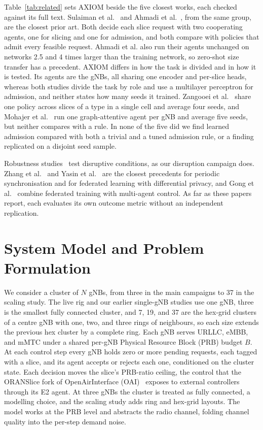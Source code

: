\documentclass[pdflatex,sn-basic,Numbered]{sn-jnl}
\begin{document}
Table~\ref{tab:related} sets AXIOM beside the five closest works, each checked against its full text. Sulaiman et al.~\cite{sulaiman2023coordinated} and Ahmadi et al.~\cite{ahmadi2024generalizable}, from the same group, are the closest prior art. Both decide each slice request with two cooperating agents, one for slicing and one for admission, and both compare with policies that admit every feasible request. Ahmadi et al. also run their agents unchanged on networks 2.5 and 4 times larger than the training network, so zero-shot size transfer has a precedent. AXIOM differs in how the task is divided and in how it is tested. Its agents are the gNBs, all sharing one encoder and per-slice heads, whereas both studies divide the task by role and use a multilayer perceptron for admission, and neither states how many seeds it trained. Zangooei et al.~\cite{zangooei2024flexible} share one policy across slices of a type in a single cell and average four seeds, and Mohajer et al.~\cite{mohajer2026pronto} run one graph-attentive agent per gNB and average five seeds, but neither compares with a rule. In none of the five did we find learned admission compared with both a trivial and a tuned admission rule, or a finding replicated on a disjoint seed sample.

Robustness studies~\cite{tashman2026adversarial,fatehi2026attentionmarl} test disruptive conditions, as our disruption campaign does. Zhang et al.~\cite{zhang2022federatedoran} and Yasin et al.~\cite{yasin2025dpfl} are the closest precedents for periodic synchronisation and for federated learning with differential privacy, and Gong et al.~\cite{gong2026femaddpg} combine federated training with multi-agent control. As far as these papers report, each evaluates its own outcome metric without an independent replication.

\section{System Model and Problem Formulation}
We consider a cluster of $N$ gNBs, from three in the main campaigns to 37 in the scaling study. The live rig and our earlier single-gNB studies use one gNB, three is the smallest fully connected cluster, and 7, 19, and 37 are the hex-grid clusters of a centre gNB with one, two, and three rings of neighbours, so each size extends the previous hex cluster by a complete ring. Each gNB serves URLLC, eMBB, and mMTC under a shared per-gNB Physical Resource Block (PRB) budget $B$. At each control step every gNB holds zero or more pending requests, each tagged with a slice, and its agent accepts or rejects each one, conditioned on the cluster state. Each decision moves the slice's PRB-ratio ceiling, the control that the ORANSlice fork of OpenAirInterface (OAI)~\cite{cheng2024oranslice} exposes to external controllers through its E2 agent. At three gNBs the cluster is treated as fully connected, a modelling choice, and the scaling study adds ring and hex-grid layouts. The model works at the PRB level and abstracts the radio channel, folding channel quality into the per-step demand noise.
\end{document}
